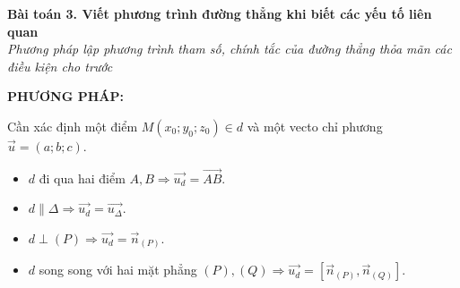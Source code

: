 \documentclass[12pt,a4paper]{article}
\newenvironment{lesson}[2]{
	\vspace{1em}\noindent\textbf{\Large #1}\\
	\textit{#2}\vspace{0.5em}
}{}
\begin{document}

\begin{lesson}{Bài toán 3. Viết phương trình đường thẳng khi biết các yếu tố liên quan}{Phương pháp lập phương trình tham số, chính tắc của đường thẳng thỏa mãn các điều kiện cho trước}

\textbf{PHƯƠNG PHÁP:}

Cần xác định một điểm $M(x_0; y_0; z_0) \in d$ và một vecto chỉ phương $\vec{u} = (a; b; c)$.
\begin{itemize}
    \item $d$ đi qua hai điểm $A, B \Rightarrow \vec{u_d} = \vec{AB}$.
    \item $d \parallel \Delta \Rightarrow \vec{u_d} = \vec{u_\Delta}$.
    \item $d \perp (P) \Rightarrow \vec{u_d} = \vec{n}_{(P)}$.
    \item $d$ song song với hai mặt phẳng $(P), (Q) \Rightarrow \vec{u_d} = [\vec{n}_{(P)}, \vec{n}_{(Q)}]$.
\end{itemize}

\end{lesson}
\end{document}
